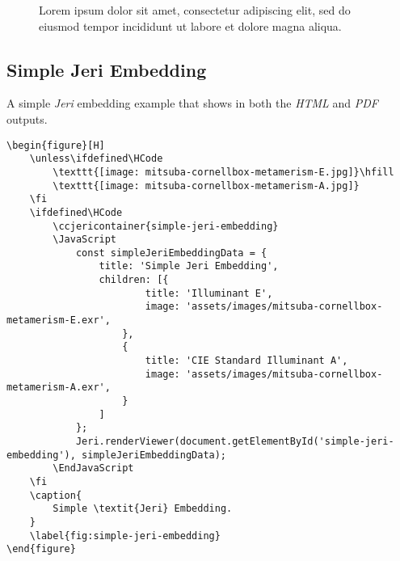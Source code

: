 \begin{figure}[H]
    
    \caption{
        Lorem ipsum dolor sit amet, consectetur adipiscing elit,
        sed do eiusmod tempor incididunt ut labore et dolore magna aliqua.
    }
    \label{fig:aces-gamuts}
\end{figure}

\subsection*{Simple Jeri Embedding}

A simple \textit{Jeri} embedding example that shows in both the \textit{HTML}
and \textit{PDF} outputs.

\begin{lstlisting}[caption={Simple \textit{Jeri} Embedding.}]
\begin{figure}[H]
    \unless\ifdefined\HCode
        \texttt{[image: mitsuba-cornellbox-metamerism-E.jpg]}\hfill
        \texttt{[image: mitsuba-cornellbox-metamerism-A.jpg]}
    \fi
    \ifdefined\HCode
        \ccjericontainer{simple-jeri-embedding}
        \JavaScript
            const simpleJeriEmbeddingData = {
                title: 'Simple Jeri Embedding',
                children: [{
                        title: 'Illuminant E',
                        image: 'assets/images/mitsuba-cornellbox-metamerism-E.exr',
                    },
                    {
                        title: 'CIE Standard Illuminant A',
                        image: 'assets/images/mitsuba-cornellbox-metamerism-A.exr',
                    }
                ]
            };
            Jeri.renderViewer(document.getElementById('simple-jeri-embedding'), simpleJeriEmbeddingData);
        \EndJavaScript
    \fi
    \caption{
        Simple \textit{Jeri} Embedding.
    }
    \label{fig:simple-jeri-embedding}
\end{figure}
\end{lstlisting}

